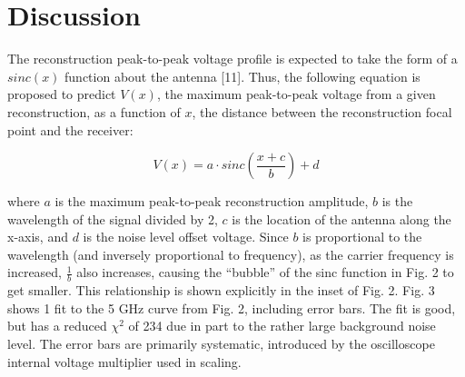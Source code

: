 
\section{Discussion}
\label{sec:spatial-profile-discussion}

The reconstruction peak-to-peak voltage profile is expected to take the form of a $sinc(x)$ function about the antenna [11]. Thus, the following equation is proposed to predict $V(x)$, the maximum peak-to-peak voltage from a given reconstruction, as a function of $x$, the distance between the reconstruction focal point and the receiver:

$$V(x) = a\cdot sinc\left(\frac{x+c}{b}\right) + d$$

where $a$ is the maximum peak-to-peak reconstruction amplitude, $b$ is the wavelength of the signal divided by 2, $c$ is the location of the antenna along the x-axis, and $d$ is the noise level
offset voltage. Since $b$ is proportional to the wavelength (and inversely proportional
to frequency), as the carrier frequency is increased,  $\frac{1}{b}$ also increases, causing the “bubble” of the sinc function in Fig. 2 to get smaller. This relationship is shown explicitly in the inset of Fig. 2. Fig. 3 shows 1 fit to the 5 GHz curve from Fig. 2, including error bars. The fit is good, but has a reduced $\chi^2$ of 234 due in part to the rather large background noise level. The error bars are primarily systematic, introduced by the oscilloscope internal voltage multiplier used in scaling.
